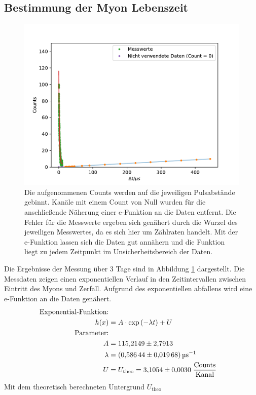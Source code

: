 \subsection{Bestimmung der Myon Lebenszeit}

\begin{figure}[ht]
    \centering
    \includegraphics[scale = 1]{./plots/e-fkt.pdf}
    \caption{Die aufgenommenen Counts werden auf die jeweiligen Pulsabstände gebinnt. Kanäle mit einem Count von Null wurden für die anschließende Näherung einer e-Funktion an die Daten entfernt. Die Fehler für die Messwerte ergeben sich genähert durch die Wurzel des jeweiligen Messwertes, da es sich hier um Zählraten handelt. Mit der e-Funktion lassen sich die Daten gut annähern und die Funktion liegt zu jedem Zeitpunkt im Unsicherheitsbereich der Daten.}
    \label{fig:efkt}
\end{figure}

Die Ergebnisse der Messung über 3 Tage sind in Abbildung \ref{fig:efkt} dargestellt.
Die Messdaten zeigen einen exponentiellen Verlauf in den Zeitintervallen zwischen Eintritt des Myons und Zerfall.
Aufgrund des exponentiellen abfallens wird eine e-Funktion an die Daten genähert.
\begin{align*}
    \text{Exponential-Funktion:}\\
    h(x) &= A \cdot \text{exp} \left(-\lambda t\right) + U\\
    \text{Parameter:}\\
    A &= \num{115.2149 +- 2.7913}\\
    \lambda &= \SI[per-mode=reciprocal]{0.58644 +- 0.01968}{\per\micro\second}\\
    U &= U_{\text{theo}} = \num{3.1054 +- 0.0030}\; \frac{\text{Counts}}{\text{Kanal}} \\
\end{align*}
Mit dem theoretisch berechneten Untergrund $U_{\text{theo}}$

